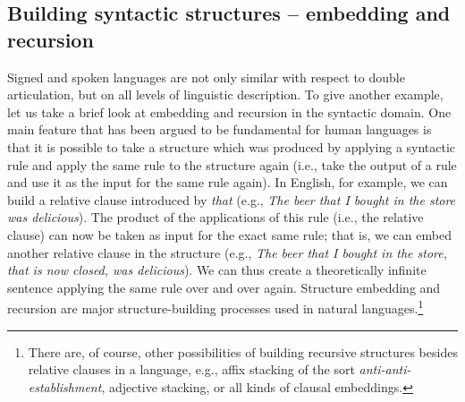 \subsection{Building syntactic structures -- embedding and recursion}
Signed and spoken languages are not only similar with respect to double articulation, but on all levels of linguistic description. To give another example, let us take a brief look at embedding and recursion in the syntactic domain. One main feature that has been argued to be fundamental for human languages is that it is possible to take a structure which was produced by applying a syntactic rule and apply the same rule to the structure again (i.e., take the output of a rule and use it as the input for the same rule again). In English, for example, we can build a relative clause introduced by \textit{that} (e.g., \textit{The beer that I bought in the store was delicious}). The product of the applications of this rule (i.e., the relative clause) can now be taken as input for the exact same rule; that is, we can embed another relative clause in the structure (e.g., \textit{The beer that I bought in the store, that is now closed, was delicious}). We can thus create a theoretically infinite sentence applying the same rule over and over again. Structure embedding and recursion are major structure-building processes used in natural languages.\footnote{ There are, of course, other possibilities of building recursive structures besides relative clauses in a language, e.g., affix stacking of the sort \textit{anti-anti-establishment}, adjective stacking, or all kinds of clausal embeddings.} 

